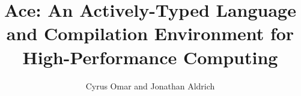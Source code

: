 \documentclass{sig-alternate}
\begin{document}
%
\title{Ace: An Actively-Typed Language and Compilation Environment for High-Performance Computing}


\author{\alignauthor
Cyrus Omar and Jonathan Aldrich\\
       \\
}


% 








\maketitle
\end{document}
